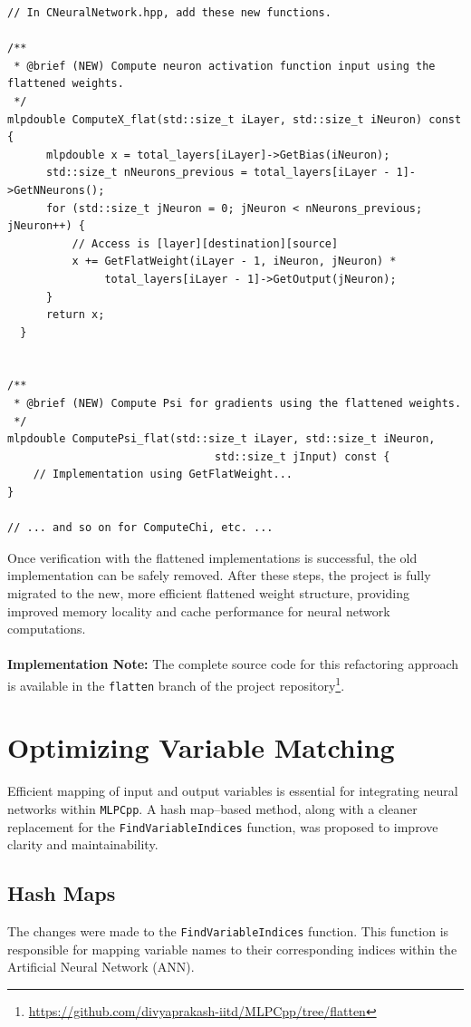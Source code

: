 \documentclass{article}
\begin{document}
\begin{verbatim}
// In CNeuralNetwork.hpp, add these new functions.

/**
 * @brief (NEW) Compute neuron activation function input using the flattened weights.
 */
mlpdouble ComputeX_flat(std::size_t iLayer, std::size_t iNeuron) const {
      mlpdouble x = total_layers[iLayer]->GetBias(iNeuron);
      std::size_t nNeurons_previous = total_layers[iLayer - 1]->GetNNeurons();
      for (std::size_t jNeuron = 0; jNeuron < nNeurons_previous; jNeuron++) {
          // Access is [layer][destination][source]
          x += GetFlatWeight(iLayer - 1, iNeuron, jNeuron) *
               total_layers[iLayer - 1]->GetOutput(jNeuron);
      }
      return x;
  }


/**
 * @brief (NEW) Compute Psi for gradients using the flattened weights.
 */
mlpdouble ComputePsi_flat(std::size_t iLayer, std::size_t iNeuron, 
                                std::size_t jInput) const { 
    // Implementation using GetFlatWeight...
}

// ... and so on for ComputeChi, etc. ...
\end{verbatim}


Once verification with the flattened implementations is successful, the old implementation can be safely removed. After these steps, the project is fully migrated to the new, more efficient flattened weight structure, providing improved memory locality and cache performance for neural network computations.
\\
\\
\noindent\textbf{Implementation Note:} The complete source code for this refactoring approach is available in the \texttt{flatten} branch of the project repository\footnote{\url{https://github.com/divyaprakash-iitd/MLPCpp/tree/flatten}}.

\section{Optimizing Variable Matching}
\label{sec:varmatch}
Efficient mapping of input and output variables is essential for integrating neural networks within \texttt{MLPCpp}. A hash map–based method, along with a cleaner replacement for the \texttt{FindVariableIndices} function, was proposed to improve clarity and maintainability.


\subsection{Hash Maps}
\label{subsec:hash}
The changes were made to the \texttt{FindVariableIndices} function. This function is responsible for mapping variable names to their corresponding indices within the Artificial Neural Network (ANN).
\end{document}
